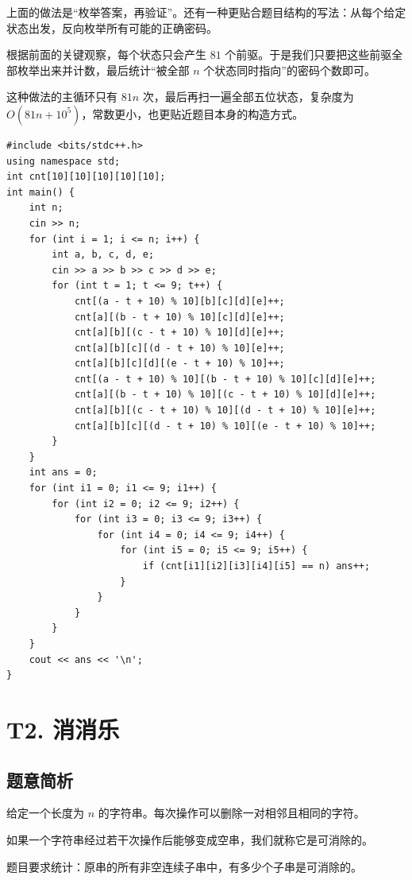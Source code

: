 \documentclass{book}
\begin{document}
    上面的做法是“枚举答案，再验证”。还有一种更贴合题目结构的写法：从每个给定状态出发，反向枚举所有可能的正确密码。

    根据前面的关键观察，每个状态只会产生 $81$ 个前驱。于是我们只要把这些前驱全部枚举出来并计数，最后统计“被全部 $n$ 个状态同时指向”的密码个数即可。

    这种做法的主循环只有 $81n$ 次，最后再扫一遍全部五位状态，复杂度为 $O(81n + 10^5)$，常数更小，也更贴近题目本身的构造方式。

    \begin{lstlisting}[style = code]
#include <bits/stdc++.h>
using namespace std;
int cnt[10][10][10][10][10];
int main() {
    int n;
    cin >> n;
    for (int i = 1; i <= n; i++) {
        int a, b, c, d, e;
        cin >> a >> b >> c >> d >> e;
        for (int t = 1; t <= 9; t++) {
            cnt[(a - t + 10) % 10][b][c][d][e]++;
            cnt[a][(b - t + 10) % 10][c][d][e]++;
            cnt[a][b][(c - t + 10) % 10][d][e]++;
            cnt[a][b][c][(d - t + 10) % 10][e]++;
            cnt[a][b][c][d][(e - t + 10) % 10]++;
            cnt[(a - t + 10) % 10][(b - t + 10) % 10][c][d][e]++;
            cnt[a][(b - t + 10) % 10][(c - t + 10) % 10][d][e]++;
            cnt[a][b][(c - t + 10) % 10][(d - t + 10) % 10][e]++;
            cnt[a][b][c][(d - t + 10) % 10][(e - t + 10) % 10]++;
        }
    }
    int ans = 0;
    for (int i1 = 0; i1 <= 9; i1++) {
        for (int i2 = 0; i2 <= 9; i2++) {
            for (int i3 = 0; i3 <= 9; i3++) {
                for (int i4 = 0; i4 <= 9; i4++) {
                    for (int i5 = 0; i5 <= 9; i5++) {
                        if (cnt[i1][i2][i3][i4][i5] == n) ans++;
                    }
                }
            }
        }
    }
    cout << ans << '\n';
}\end{lstlisting}
    \newpage
    \section{T2. 消消乐}

    \subsection{题意简析}

    给定一个长度为 $n$ 的字符串。每次操作可以删除一对相邻且相同的字符。

    如果一个字符串经过若干次操作后能够变成空串，我们就称它是可消除的。

    题目要求统计：原串的所有非空连续子串中，有多少个子串是可消除的。
\end{document}
